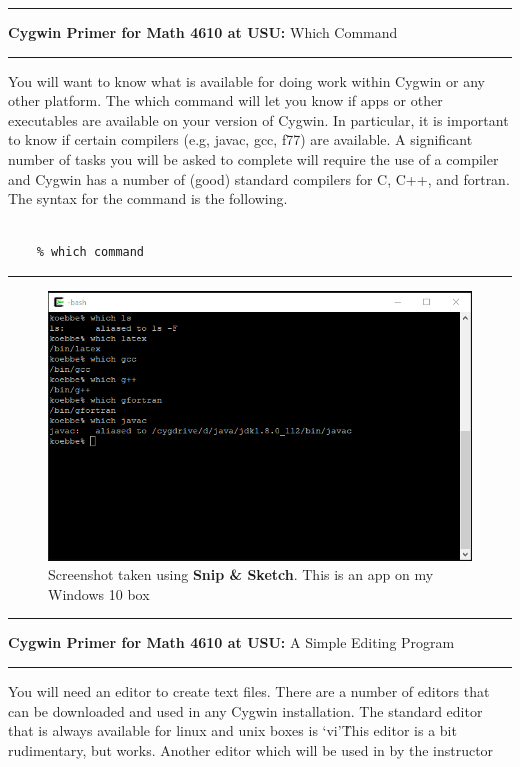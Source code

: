 \documentclass[10pt,fleqn]{article}
\begin{document}
\vskip0.1in\hrule\vskip0.1in
\noindent
{{\bf Cygwin Primer for Math 4610 at USU:} Which Command} 
\vskip0.1in\hrule\vskip0.1in
\noindent
You will want to know what is available for doing work within Cygwin or any
other platform. The which command will let you know if apps or other executables
are available on your version of Cygwin. In particular, it is important to know
if certain compilers (e.g, javac, gcc, f77) are available. A significant number
of tasks you will be asked to complete will require the use of a compiler and
Cygwin has a number of (good) standard compilers for C, C++, and fortran. The
syntax for the command is the following.
\begin{verbatim}

    % which command

\end{verbatim}
\vskip0.1in\hrule\vskip0.1in
\vfill
\begin{figure}[h]
\centering
\includegraphics{../images/cygwin_04.png}
\caption{{Screenshot} taken using {\bf Snip \& Sketch}. This is an app on
         my Windows 10 box}
\end{figure}
\eject
\vskip0.1in\hrule\vskip0.1in
\noindent
{{\bf Cygwin Primer for Math 4610 at USU:} A Simple Editing Program} 
\vskip0.1in\hrule\vskip0.1in
\noindent
You will need an editor to create text files. There are a number of editors that
can be downloaded and used in any Cygwin installation. The standard editor that
is always available for linux and unix boxes is \lq vi\rq\. This editor is a bit
rudimentary, but works. Another editor which will be used in by the instructor
\end{document}

